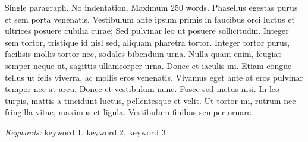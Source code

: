 \vspace{0.5\baselineskip}

\relax
{}\relax



\noindent Single paragraph. No indentation. Maximum 250 words. Phasellus egestas purus et sem porta venenatis. Vestibulum ante ipsum primis in faucibus orci luctus et ultrices posuere cubilia curae; Sed pulvinar leo ut posuere sollicitudin. Integer sem tortor, tristique id nisl sed, aliquam pharetra tortor. Integer tortor purus, facilisis mollis tortor nec, sodales bibendum urna. Nulla quam enim, feugiat semper neque ut, sagittis ullamcorper urna. Donec et iaculis mi. Etiam congue tellus ut felis viverra, ac mollis eros venenatis. Vivamus eget ante at eros pulvinar tempor nec at arcu. Donec et vestibulum nunc. Fusce sed metus nisi. In leo turpis, mattis a tincidunt luctus, pellentesque et velit. Ut tortor mi, rutrum nec fringilla vitae, maximus et ligula. Vestibulum finibus semper ornare.


\textit{Keywords:} keyword 1, keyword 2, keyword 3

\vspace{0.75\baselineskip}

\relax
{}\relax
\raggedright
\setlength\parindent{0.5in}